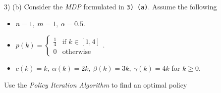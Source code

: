 \documentclass[11pt,a4paper]{article}
\begin{document}
\begin{question}{3) (b)}
  Consider the \textit{MDP} formulated in \texttt{3) (a)}. Assume the following
  \begin{itemize}
    \item $n=1,\ m=1,\ \alpha=0.5$.
    \item $p(k)=\begin{cases}\frac14&\text{if }k\in[1,4]\\0&\text{otherwise}\end{cases}$.
    \item $c(k)=k,\ \alpha(k)=2k,\ \beta(k)=3k,\ \gamma(k)=4k$ for $k\geq0$.
  \end{itemize}
  Use the \textit{Policy Iteration Algorithm} to find an optimal policy
\end{question}
\end{document}

